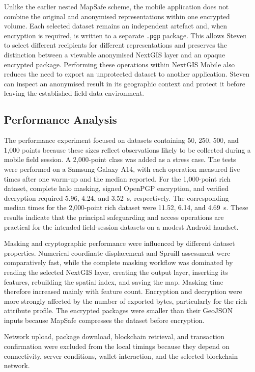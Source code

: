 \documentclass[]{interact}
\begin{document}
Unlike the earlier nested MapSafe scheme, the mobile application does not combine the original and anonymised representations within one encrypted volume. Each selected dataset remains an independent artefact and, when encryption is required, is written to a separate \texttt{.pgp} package. This allows Steven to select different recipients for different representations and preserves the distinction between a viewable anonymised NextGIS layer and an opaque encrypted package. Performing these operations within NextGIS Mobile also reduces the need to export an unprotected dataset to another application. Steven can inspect an anonymised result in its geographic context and protect it before leaving the established field-data environment.

\subsection{Performance Analysis}

The performance experiment focused on datasets containing 50, 250, 500, and 1,000 points because these sizes reflect observations likely to be collected during a mobile field session. A 2,000-point class was added as a stress case. The tests were performed on a Samsung Galaxy A14, with each operation measured five times after one warm-up and the median reported. For the 1,000-point rich dataset, complete halo masking, signed OpenPGP encryption, and verified decryption required 5.96, 4.24, and 3.52~s, respectively. The corresponding median times for the 2,000-point rich dataset were 11.52, 6.14, and 4.69~s. These results indicate that the principal safeguarding and access operations are practical for the intended field-session datasets on a modest Android handset.

Masking and cryptographic performance were influenced by different dataset properties. Numerical coordinate displacement and Spruill assessment were comparatively fast, while the complete masking workflow was dominated by reading the selected NextGIS layer, creating the output layer, inserting its features, rebuilding the spatial index, and saving the map. Masking time therefore increased mainly with feature count. Encryption and decryption were more strongly affected by the number of exported bytes, particularly for the rich attribute profile. The encrypted packages were smaller than their GeoJSON inputs because MapSafe compresses the dataset before encryption.

Network upload, package download, blockchain retrieval, and transaction confirmation were excluded from the local timings because they depend on connectivity, server conditions, wallet interaction, and the selected blockchain network.
\end{document}
